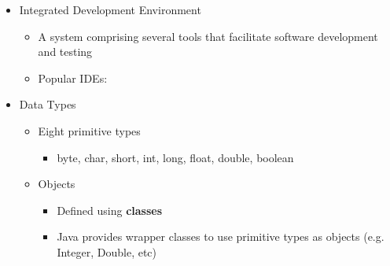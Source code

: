 \begin{itemize}
	\item Integrated Development Environment
	\begin{itemize}
		\item A system comprising several tools that facilitate software development and testing
		\item Popular IDEs:
	\end{itemize}

	\item Data Types
	\begin{itemize}
		\item Eight primitive types
		\begin{itemize}
			\item byte, char, short, int, long, float, double, boolean
		\end{itemize}
		\item Objects
		\begin{itemize}
			\item Defined using \textbf{classes}
			\item Java provides wrapper classes to use primitive types as objects (e.g. Integer, Double, etc)
		\end{itemize}
	\end{itemize}


\end{itemize}

